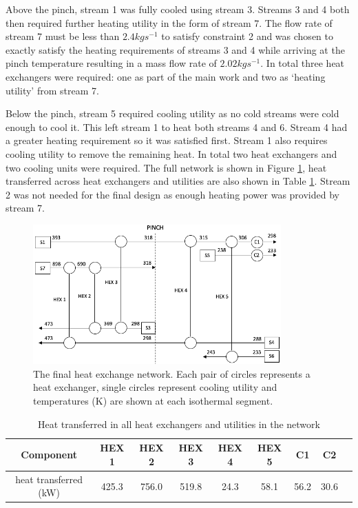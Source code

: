Above the pinch, stream 1 was fully cooled using stream 3. Streams 3 and 4 both then required further heating utility in the form of stream 7. The flow rate of stream 7 must be less than $2.4 kg s^{-1}$ to satisfy constraint 2 and was chosen to exactly satisfy the heating requirements of streams 3 and 4 while arriving at the pinch temperature resulting in a mass flow rate of $2.02 kg s^{-1}$. In total three heat exchangers were required: one as part of the main work and two as `heating utility' from stream 7. 

Below the pinch, stream 5 required cooling utility as no cold streams were cold enough to cool it. This left stream 1 to heat both streams 4 and 6. Stream 4 had a greater heating requirement so it was satisfied first. Stream 1 also requires cooling utility to remove the remaining heat. In total two heat exchangers and two cooling units were required. The full network is shown in Figure \ref{fig:heatexnetwork}, heat transferred across heat exchangers and utilities are also shown in Table \ref{tab:powerhex}. Stream 2 was not needed for the final design as enough heating power was provided by stream 7. 

\begin{figure} [h]
\centering
\includegraphics[width=0.85\textwidth]{./pictures/heatexnetworkBIG.png}
  \caption{The final heat exchange network. Each pair of circles represents a heat exchanger, single circles represent cooling utility and temperatures (K) are shown at each isothermal segment.} \label{fig:heatexnetwork}
  \end{figure}

\begin {table} [h]
\begin{center}
\caption{Heat transferred in all heat exchangers and utilities in the network} \label{tab:powerhex} 
\begin{tabular}{ |c|c|c|c|c|c|c|c|c| }
 \hline
  Component & HEX 1 & HEX 2 & HEX 3 & HEX 4 &HEX 5 & C1 & C2\\ 
 \hline
 heat transferred (kW) & 425.3 & 756.0 & 519.8 & 24.3 & 58.1 & 56.2 & 30.6\\ 
 \hline
\end{tabular}
\end{center}  
\end {table}

